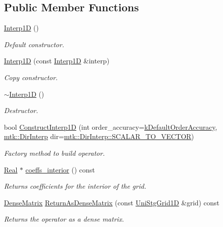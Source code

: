 \subsection*{Public Member Functions}
\begin{DoxyCompactItemize}
\item 
\hyperlink{classmtk_1_1Interp1D_ae56f90c53579c91c1dbe715f7e7361be}{Interp1\+D} ()
\begin{DoxyCompactList}\small\item\em Default constructor. \end{DoxyCompactList}\item 
\hyperlink{classmtk_1_1Interp1D_a92a5ed77144b3824d201a586f4072fd0}{Interp1\+D} (const \hyperlink{classmtk_1_1Interp1D}{Interp1\+D} \&interp)
\begin{DoxyCompactList}\small\item\em Copy constructor. \end{DoxyCompactList}\item 
\hyperlink{classmtk_1_1Interp1D_a52ea06b5e3d7082eb06ade256f4e30fb}{$\sim$\+Interp1\+D} ()
\begin{DoxyCompactList}\small\item\em Destructor. \end{DoxyCompactList}\item 
bool \hyperlink{classmtk_1_1Interp1D_ace09ceeb508afde5d95f20a8e73d5315}{Construct\+Interp1\+D} (int order\+\_\+accuracy=\hyperlink{group__c01-roots_ga0d95560098eb36420511103637b6952f}{k\+Default\+Order\+Accuracy}, \hyperlink{group__c02-enums_ga674ec67bd1baa04e5dc06c2bcc351972}{mtk\+::\+Dir\+Interp} dir=\hyperlink{namespacemtk_ga674ec67bd1baa04e5dc06c2bcc351972a53facfbeb6725b2bd220c8d9811a0673}{mtk\+::\+Dir\+Interp\+::\+S\+C\+A\+L\+A\+R\+\_\+\+T\+O\+\_\+\+V\+E\+C\+T\+O\+R})
\begin{DoxyCompactList}\small\item\em Factory method to build operator. \end{DoxyCompactList}\item 
\hyperlink{group__c01-roots_gac080bbbf5cbb5502c9f00405f894857d}{Real} $\ast$ \hyperlink{classmtk_1_1Interp1D_a652289cbb0000d3f4e5e8d632aaf4b03}{coeffs\+\_\+interior} () const 
\begin{DoxyCompactList}\small\item\em Returns coefficients for the interior of the grid. \end{DoxyCompactList}\item 
\hyperlink{classmtk_1_1DenseMatrix}{Dense\+Matrix} \hyperlink{classmtk_1_1Interp1D_aee8126b8a4be378a30be4d95b43b384b}{Return\+As\+Dense\+Matrix} (const \hyperlink{classmtk_1_1UniStgGrid1D}{Uni\+Stg\+Grid1\+D} \&grid) const 
\begin{DoxyCompactList}\small\item\em Returns the operator as a dense matrix. \end{DoxyCompactList}\end{DoxyCompactItemize}
